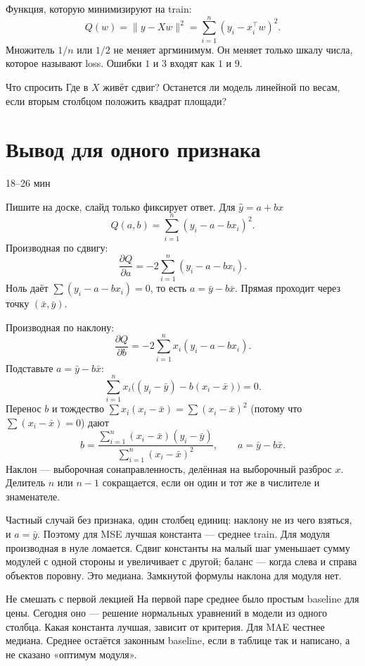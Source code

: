 \documentclass[11pt,a4paper]{article}
\newcommand{\timing}[1]{\hfill{\small\color{blue}#1}}
\begin{document}
Функция, которую минимизируют на train:
\[
Q(w)=\|y-Xw\|^{2}=\sum_{i=1}^{n}(y_i-x_i^{\top}w)^{2}.
\]
Множитель \(1/n\) или \(1/2\) не меняет аргминимум. Он меняет только шкалу числа, которое называют loss. Ошибки \(1\) и \(3\) входят как \(1\) и \(9\).

\begin{saybox}{Что спросить}
Где в \(X\) живёт сдвиг? Останется ли модель линейной по весам, если вторым столбцом положить квадрат площади?
\end{saybox}

\section{Вывод для одного признака}

\timing{18--26 мин}

Пишите на доске, слайд только фиксирует ответ. Для \(\hat y=a+bx\)
\[
Q(a,b)=\sum_{i=1}^{n}(y_i-a-bx_i)^{2}.
\]
Производная по сдвигу:
\[
\frac{\partial Q}{\partial a}=-2\sum_{i=1}^{n}(y_i-a-bx_i).
\]
Ноль даёт \(\sum(y_i-a-bx_i)=0\), то есть \(a=\bar y-b\bar x\). Прямая проходит через точку \((\bar x,\bar y)\).

Производная по наклону:
\[
\frac{\partial Q}{\partial b}=-2\sum_{i=1}^{n}x_i(y_i-a-bx_i).
\]
Подставьте \(a=\bar y-b\bar x\):
\[
\sum_{i=1}^{n}x_i\bigl((y_i-\bar y)-b(x_i-\bar x)\bigr)=0.
\]
Перенос \(b\) и тождество \(\sum x_i(x_i-\bar x)=\sum(x_i-\bar x)^{2}\) (потому что \(\sum(x_i-\bar x)=0\)) дают
\[
b=\frac{\sum_{i=1}^{n}(x_i-\bar x)(y_i-\bar y)}{\sum_{i=1}^{n}(x_i-\bar x)^{2}},\qquad a=\bar y-b\bar x.
\]
Наклон --- выборочная сонаправленность, делённая на выборочный разброс \(x\). Делитель \(n\) или \(n-1\) сокращается, если он один и тот же в числителе и знаменателе.

Частный случай без признака, один столбец единиц: наклону не из чего взяться, и \(a=\bar y\). Поэтому для MSE лучшая константа --- среднее train. Для модуля производная в нуле ломается. Сдвиг константы на малый шаг уменьшает сумму модулей с одной стороны и увеличивает с другой; баланс --- когда слева и справа объектов поровну. Это медиана. Замкнутой формулы наклона для модуля нет.

\begin{warnbox}{Не смешать с первой лекцией}
На первой паре среднее было простым baseline для цены. Сегодня оно --- решение нормальных уравнений в модели из одного столбца. Какая константа лучшая, зависит от критерия. Для MAE честнее медиана. Среднее остаётся законным baseline, если в таблице так и написано, а не сказано «оптимум модуля».
\end{warnbox}
\end{document}
